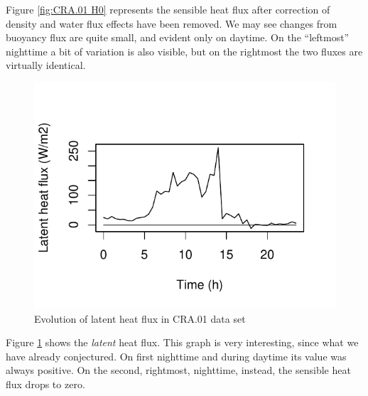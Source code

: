 \documentclass[a4paper,10pt]{book}
\begin{document}
Figure \ref{fig:CRA.01 H0} represents the sensible heat flux after correction of density and water flux effects have been removed. We may see changes from buoyancy flux are quite small, and evident only on daytime. On the ``leftmost'' nighttime a bit of variation is also visible, but on the rightmost the two fluxes are virtually identical.

\begin{figure}[htp]
 \centering
 \begin{center}
 \includegraphics[scale=1.1,keepaspectratio=true]{./diagrams/CRA01_He.pdf}
 \end{center}
 \caption{Evolution of latent heat flux in CRA.01 data set}
 \label{fig:CRA.01 He}
\end{figure}

Figure \ref{fig:CRA.01 He} shows the \emph{latent} heat flux. This graph is very interesting, since what we have already conjectured. On first nighttime and during daytime its value was always positive. On the second, rightmost, nighttime, instead, the sensible heat flux drops to zero.
\end{document}
